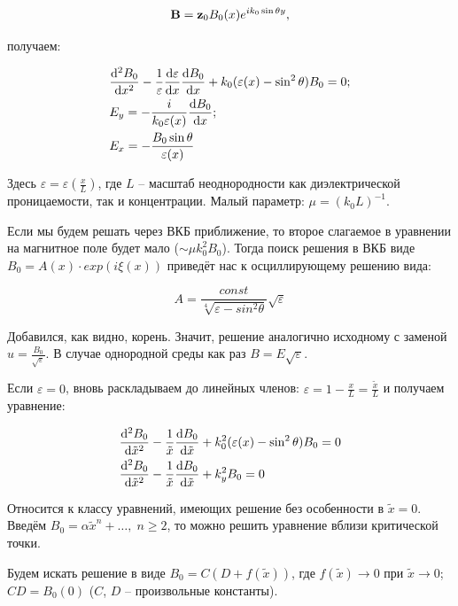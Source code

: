 \documentclass[10pt, a4paper]{article}
\begin{document}
\begin{equation*}
	\vb{B} = \vb{z}_0B_0(x)e^{ik_0\sin\theta y},
\end{equation*}

получаем:

\begin{align*}
	&\dv[2]{B_0}{x} -\frac{1}{\varepsilon}\dv{\varepsilon}{x}\dv{B_0}{x}+k_0(\varepsilon(x)-\sin^2\theta)B_0 = 0; \\
	&E_y = -\frac{i}{k_0\varepsilon(x)}\dv{B_0}{x}; \\
	&E_x = -\frac{B_0\sin\theta}{\varepsilon(x)}
\end{align*}

Здесь $\varepsilon = \varepsilon(\frac{x}{L})$, где $L$ -- масштаб неоднородности как диэлектрической проницаемости, так и концентрации. Малый параметр: $\mu = (k_0L)^{-1}$.

Если мы будем решать через ВКБ приближение, то второе слагаемое в уравнении на магнитное поле будет мало ($\sim\mu k_0^2B_0$). Тогда поиск решения в ВКБ виде $B_0 = A(x)\cdot exp(i\xi(x))$ приведёт нас к осциллирующему решению вида:

\begin{equation*}
	A = \frac{const}{\sqrt[4]{\varepsilon-sin^2\theta}} \sqrt{\varepsilon}
\end{equation*}

Добавился, как видно, корень. Значит, решение аналогично исходному с заменой $u = \frac{B_0}{\sqrt{\varepsilon}}$. В случае однородной среды как раз $B=E\sqrt{\varepsilon}$.

Если $\varepsilon = 0$, вновь раскладываем до линейных членов: $\varepsilon = 1-\frac{x}{L}=\frac{\tilde{x}}{L}$ и получаем уравнение:

\begin{align*}
	&\dv[2]{B_0}{\tilde{x}} - \frac{1}{\tilde{x}}\dv{B_0}{\tilde{x}} + k_0^2(\varepsilon(x)-\sin^2\theta)B_0 = 0 \\
	&\dv[2]{B_0}{\tilde{x}} - \frac{1}{\tilde{x}}\dv{B_0}{\tilde{x}} + k_y^2B_0 = 0
\end{align*}

Относится к классу уравнений, имеющих решение без особенности в $\tilde{x} = 0$. Введём $B_0 = \alpha\tilde{x}^n+\ldots,\;n\geq2$, то можно решить уравнение вблизи критической точки.

Будем искать решение в виде $B_0 = C(D+f(\tilde{x}))$, где $f(\tilde{x})\rightarrow0$ при $\tilde{x}\rightarrow0$; $CD = B_0(0)$ ($C$, $D$ -- произвольные константы).
\end{document}
